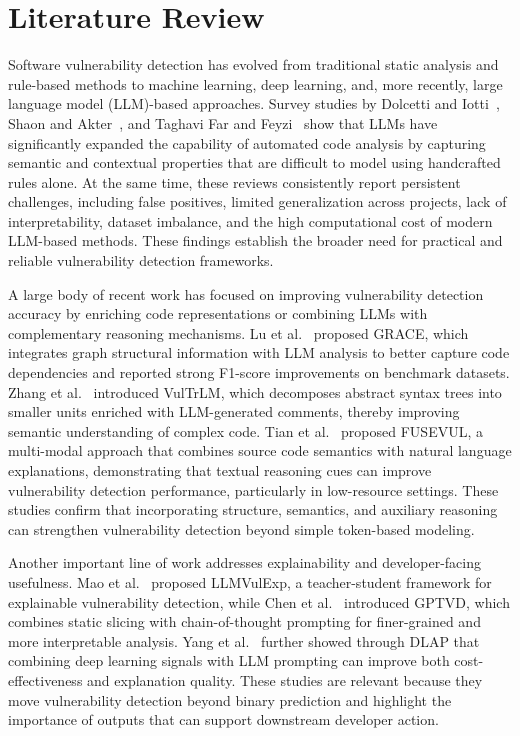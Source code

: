 \documentclass[conference]{IEEEtran}
\begin{document}
\section{Literature Review}

Software vulnerability detection has evolved from traditional static analysis and rule-based methods to machine learning, deep learning, and, more recently, large language model (LLM)-based approaches. Survey studies by Dolcetti and Iotti~\cite{dolcetti2025}, Shaon and Akter~\cite{shaon2025}, and Taghavi Far and Feyzi~\cite{taghavifar2025} show that LLMs have significantly expanded the capability of automated code analysis by capturing semantic and contextual properties that are difficult to model using handcrafted rules alone. At the same time, these reviews consistently report persistent challenges, including false positives, limited generalization across projects, lack of interpretability, dataset imbalance, and the high computational cost of modern LLM-based methods. These findings establish the broader need for practical and reliable vulnerability detection frameworks.

A large body of recent work has focused on improving vulnerability detection accuracy by enriching code representations or combining LLMs with complementary reasoning mechanisms. Lu et al.~\cite{lu2024} proposed GRACE, which integrates graph structural information with LLM analysis to better capture code dependencies and reported strong F1-score improvements on benchmark datasets. Zhang et al.~\cite{zhang2025} introduced VulTrLM, which decomposes abstract syntax trees into smaller units enriched with LLM-generated comments, thereby improving semantic understanding of complex code. Tian et al.~\cite{tian2025} proposed FUSEVUL, a multi-modal approach that combines source code semantics with natural language explanations, demonstrating that textual reasoning cues can improve vulnerability detection performance, particularly in low-resource settings. These studies confirm that incorporating structure, semantics, and auxiliary reasoning can strengthen vulnerability detection beyond simple token-based modeling.

Another important line of work addresses explainability and developer-facing usefulness. Mao et al.~\cite{mao2025} proposed LLMVulExp, a teacher-student framework for explainable vulnerability detection, while Chen et al.~\cite{chen2026} introduced GPTVD, which combines static slicing with chain-of-thought prompting for finer-grained and more interpretable analysis. Yang et al.~\cite{yang2025} further showed through DLAP that combining deep learning signals with LLM prompting can improve both cost-effectiveness and explanation quality. These studies are relevant because they move vulnerability detection beyond binary prediction and highlight the importance of outputs that can support downstream developer action.
\end{document}
